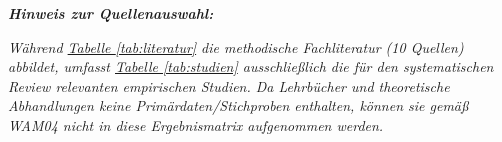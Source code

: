 \begin{enumerate}[label=\thechapter.\arabic*), leftmargin=*]
\begin{table}[H]
\begin{tabular}
                \hline
            \end{tabular}
            \caption{Übersicht der empirischen Studienergebnisse zum agilen Projektmanagement}
            \label{tab:studien}
        \end{table}
    \cleardoublepage
    \textbf{\textit{Hinweis zur Quellenauswahl:}} \par \textit{Während \hyperref[tab:literatur]{Tabelle \ref{tab:literatur}} die methodische Fachliteratur (\textit{10 Quellen}) abbildet, umfasst \hyperref[tab:studien]{Tabelle \ref{tab:studien}} ausschließlich die für den systematischen Review relevanten empirischen Studien. Da Lehrbücher und theoretische Abhandlungen keine Primärdaten/Stichproben enthalten, können sie gemäß WAM04 nicht in diese Ergebnismatrix aufgenommen werden.}
\end{enumerate}


